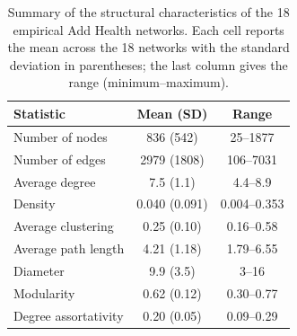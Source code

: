 \begin{table}[htbp]
    \centering
    \caption{Summary of the structural characteristics of the 18 empirical Add Health networks. Each cell reports the mean across the 18 networks with the standard deviation in parentheses; the last column gives the range (minimum--maximum).}
    \label{stab:network-summary}
    \begin{tabular*}{0.5\textwidth}{@{\extracolsep{\fill}} l c c}
        \hline\hline
        Statistic & Mean (SD) & Range \\
        \hline
        Number of nodes        & 836 (542) & 25--1877 \\
        Number of edges        & 2979 (1808) & 106--7031 \\
        Average degree         & 7.5 (1.1) & 4.4--8.9 \\
        Density                & 0.040 (0.091) & 0.004--0.353 \\
        Average clustering     & 0.25 (0.10) & 0.16--0.58 \\
        Average path length    & 4.21 (1.18) & 1.79--6.55 \\
        Diameter               & 9.9 (3.5) & 3--16 \\
        Modularity             & 0.62 (0.12) & 0.30--0.77 \\
        Degree assortativity   & 0.20 (0.05) & 0.09--0.29 \\
        \hline\hline
    \end{tabular*}
\end{table}
